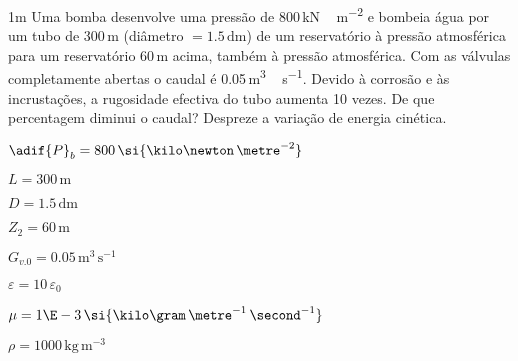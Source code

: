 \documentclass[\mainfilename]{subfiles}
\begin{document}
\begin{questionBox}1m{ %
    Uma bomba desenvolve uma pressão de 800\,\si{\kilo\newton\,\metre^{-2}} e bombeia água por um tubo de 300\,\si{\metre} (diâmetro \(= 1.5\,\si{\deci\metre}\)) de um reservatório à pressão atmosférica para um reservatório 60\,\si{\metre} acima, também à pressão atmosférica. Com as válvulas completamente abertas o caudal é 0.05\,\si{\metre^3\,\second^{-1}}. Devido à corrosão e às incrustações, a rugosidade efectiva do tubo aumenta 10 vezes. De que percentagem diminui o caudal? Despreze a variação de energia cinética.
} %
    
    \begin{itemize}
        \begin{multicols}{3}
            \item \(\adif{P}_b = 800\,\si{\kilo\newton\,\metre^{-2}}\)
            \item \(L = 300\,\si{\metre}\)
            \item \(D = 1.5\,\si{\deci\metre}\)
            \item \(Z_2 = 60\,\si{\metre}\)
            \item \(G_{v.0} = 0.05\,\si{\metre^3\,\second^{-1}}\)
            \item \(\varepsilon=10\,\varepsilon_0\)
            \item \(\mu = 1\E-3\,\si{\kilo\gram\,\metre^{-1}\,\second^{-1}}\)
            \item \(\rho = 1000\,\si{\kilo\gram\,\metre^{-3}}\) 
        \end{multicols}
    \end{itemize}


\end{questionBox}
\end{document}
